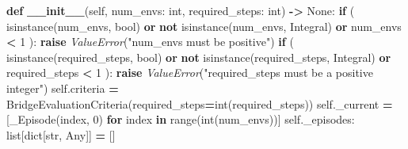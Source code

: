 \documentclass[
  chinese,
  11pt,
  letterpaper,
]{article}
\newenvironment{Shaded}{\begin{snugshade}}{\end{snugshade}}
\newcommand{\BuiltInTok}[1]{#1}
\newcommand{\ControlFlowTok}[1]{\textcolor[rgb]{0.13,0.29,0.53}{\textbf{#1}}}
\newcommand{\DecValTok}[1]{\textcolor[rgb]{0.00,0.00,0.81}{#1}}
\newcommand{\FunctionTok}[1]{\textcolor[rgb]{0.13,0.29,0.53}{\textbf{#1}}}
\newcommand{\KeywordTok}[1]{\textcolor[rgb]{0.13,0.29,0.53}{\textbf{#1}}}
\newcommand{\NormalTok}[1]{#1}
\newcommand{\OperatorTok}[1]{\textcolor[rgb]{0.81,0.36,0.00}{\textbf{#1}}}
\newcommand{\PreprocessorTok}[1]{\textcolor[rgb]{0.56,0.35,0.01}{\textit{#1}}}
\newcommand{\StringTok}[1]{\textcolor[rgb]{0.31,0.60,0.02}{#1}}
\newcommand{\VariableTok}[1]{\textcolor[rgb]{0.00,0.00,0.00}{#1}}
\renewenvironment{Shaded}{\par\smallskip}{\par\smallskip}
\begin{document}
\begin{Shaded}
\begin{Highlighting}[]
    \KeywordTok{def} \FunctionTok{\_\_init\_\_}\NormalTok{(}\VariableTok{self}\NormalTok{, num\_envs: }\BuiltInTok{int}\NormalTok{, required\_steps: }\BuiltInTok{int}\NormalTok{) }\OperatorTok{{-}\textgreater{}} \VariableTok{None}\NormalTok{:}
        \ControlFlowTok{if}\NormalTok{ (}
            \BuiltInTok{isinstance}\NormalTok{(num\_envs, }\BuiltInTok{bool}\NormalTok{)}
            \KeywordTok{or} \KeywordTok{not} \BuiltInTok{isinstance}\NormalTok{(num\_envs, Integral)}
            \KeywordTok{or}\NormalTok{ num\_envs }\OperatorTok{\textless{}} \DecValTok{1}
\NormalTok{        ):}
            \ControlFlowTok{raise} \PreprocessorTok{ValueError}\NormalTok{(}\StringTok{"num\_envs must be positive"}\NormalTok{)}
        \ControlFlowTok{if}\NormalTok{ (}
            \BuiltInTok{isinstance}\NormalTok{(required\_steps, }\BuiltInTok{bool}\NormalTok{)}
            \KeywordTok{or} \KeywordTok{not} \BuiltInTok{isinstance}\NormalTok{(required\_steps, Integral)}
            \KeywordTok{or}\NormalTok{ required\_steps }\OperatorTok{\textless{}} \DecValTok{1}
\NormalTok{        ):}
            \ControlFlowTok{raise} \PreprocessorTok{ValueError}\NormalTok{(}\StringTok{"required\_steps must be a positive integer"}\NormalTok{)}
        \VariableTok{self}\NormalTok{.criteria }\OperatorTok{=}\NormalTok{ BridgeEvaluationCriteria(required\_steps}\OperatorTok{=}\BuiltInTok{int}\NormalTok{(required\_steps))}
        \VariableTok{self}\NormalTok{.\_current }\OperatorTok{=}\NormalTok{ [\_Episode(index, }\DecValTok{0}\NormalTok{) }\ControlFlowTok{for}\NormalTok{ index }\KeywordTok{in} \BuiltInTok{range}\NormalTok{(}\BuiltInTok{int}\NormalTok{(num\_envs))]}
        \VariableTok{self}\NormalTok{.\_episodes: }\BuiltInTok{list}\NormalTok{[}\BuiltInTok{dict}\NormalTok{[}\BuiltInTok{str}\NormalTok{, Any]] }\OperatorTok{=}\NormalTok{ []}


\end{Highlighting}
\end{Shaded}
\end{document}
